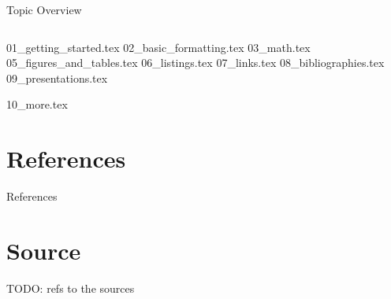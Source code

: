 



\begin{frame}{Topic Overview}
\begin{columns}[c,onlytextwidth]
\tableofcontents[sections={1-4}]
\tableofcontents[sections={5-8}]
\end{columns}
\end{frame}

{01_getting_started.tex}
{02_basic_formatting.tex}
{03_math.tex}
{05_figures_and_tables.tex}
{06_listings.tex}
{07_links.tex}
{08_bibliographies.tex}
{09_presentations.tex}

\appendix
\beginbackup

{10_more.tex}

\section{References}
\begin{frame}[allowframebreaks]{References}
\printbibliography
\end{frame}

\backupend

\section{Source}
\begin{frame}
   TODO: refs to the sources
\end{frame}


